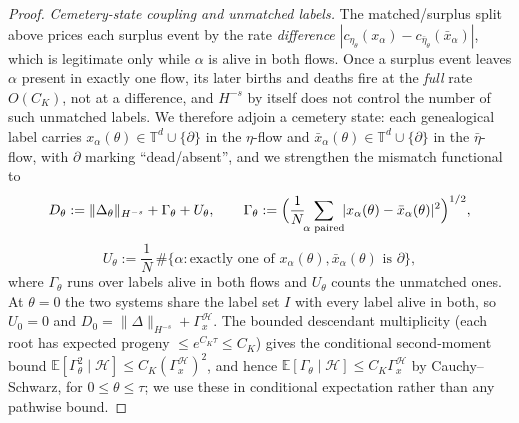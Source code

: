 \documentclass[a4paper,fleqn]{cas-sc}
\theoremstyle{definition}
\theoremstyle{remark}
\begin{document}
\begin{proof}
\emph{Cemetery-state coupling and unmatched labels.} The matched/surplus split above
prices each surplus event by the rate \emph{difference}
$|c_{\eta_\theta}(x_\alpha)-c_{\bar\eta_\theta}(\bar x_\alpha)|$, which is legitimate
only while $\alpha$ is alive in both flows. Once a surplus event leaves $\alpha$ present
in exactly one flow, its later births and deaths fire at the \emph{full} rate $O(C_K)$,
not at a difference, and $H^{-s}$ by itself does not control the number of such
unmatched labels. We therefore adjoin a cemetery state: each genealogical label carries
$x_\alpha(\theta)\in\mathbb T^d\cup\{\partial\}$ in the $\eta$-flow and
$\bar x_\alpha(\theta)\in\mathbb T^d\cup\{\partial\}$ in the $\bar\eta$-flow, with
$\partial$ marking ``dead/absent'', and we strengthen the mismatch functional to
\[
D_\theta:=\|\Delta_\theta\|_{H^{-s}}+\Gamma_\theta+U_\theta,\qquad
\Gamma_\theta:=\Bigl(\frac1N\!\!\sum_{\alpha\text{ paired}}\!\!|x_\alpha(\theta)-\bar x_\alpha(\theta)|^2\Bigr)^{1/2},
\]
\[
U_\theta:=\frac1N\,\#\bigl\{\alpha:\text{exactly one of }x_\alpha(\theta),\bar x_\alpha(\theta)\text{ is }\partial\bigr\},
\]
where $\Gamma_\theta$ runs over labels alive in both flows and $U_\theta$ counts the
unmatched ones. At $\theta=0$ the two systems share the label set $I$ with every label
alive in both, so $U_0=0$ and $D_0=\|\Delta\|_{H^{-s}}+\Gamma_x^{\mathcal H}$. The
bounded descendant multiplicity (each root has expected progeny $\le e^{C_K\tau}\le C_K$)
gives the conditional second-moment bound
$\mathbb E[\Gamma_\theta^2\mid\mathcal H]\le C_K(\Gamma_x^{\mathcal H})^2$, and hence
$\mathbb E[\Gamma_\theta\mid\mathcal H]\le C_K\Gamma_x^{\mathcal H}$ by Cauchy--Schwarz,
for $0\le\theta\le\tau$; we use these in conditional expectation rather than any
pathwise bound.


\end{proof}
\end{document}

